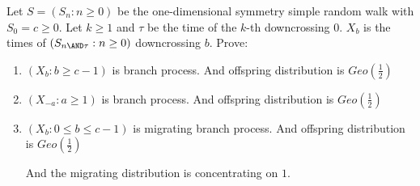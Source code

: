 \documentclass{ctexart}
\newif\ifpreface
\begin{document}
\large
\setlength{\baselineskip}{1.2em}
\ifpreface
  
\else
\fi
{}
\begin{problem}\label{pro:1}
  Let \(S=(S_n:n \geq 0)\) be the one-dimensional symmetry simple random walk with \(S_0=c \geq 0\).
  Let \(k \geq 1\) and \(\tau\) be the time of the \(k\)-th downcrossing \(0\).
  \(X_b\) is the times of \((S_{n \AND \tau}:n \geq 0)\) downcrossing \(b\). Prove:
  \begin{enumerate}
    \item \((X_b:b \geq c-1)\) is branch process.
      And offspring distribution is \(Geo(\frac{1}{2})\)

    \item \((X_{-a}:a \geq 1)\) is branch process.
      And offspring distribution is \(Geo(\frac{1}{2})\)

    \item \((X_b:0 \leq b \leq c-1)\) is migrating branch process.
      And offspring distribution is \(Geo(\frac{1}{2})\)

      And the migrating distribution is concentrating on \(1\).

  \end{enumerate}
\end{problem}
\end{document}
